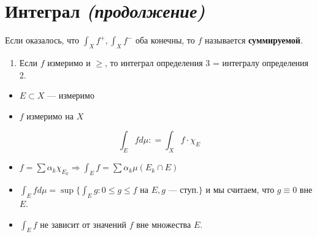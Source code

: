 

\cfoot{}



\section*{Интеграл \textit{(продолжение)}}

\begin{definition}
    Если оказалось, что \(\int_X f^{ +}, \int_X f^{ -}\) оба конечны, то \(f\) называется \textbf{суммируемой}.
\end{definition}

\begin{remark}\itemfix
    \begin{enumerate}
        \item Если \(f\) измеримо и \( \geq \), то интеграл определения 3 = интегралу определения 2.
    \end{enumerate}
\end{remark}

\begin{definition}[4]\itemfix
    \begin{itemize}
        \item \(E\subset X\) --- измеримо
        \item \(f\) измеримо на \(X\)
    \end{itemize}
    \[\int_E f d\mu : = \int_X f \cdot \chi_E\]
\end{definition}

\begin{remark}\itemfix
    \begin{itemize}
        \item \(f = \sum \alpha_k \chi_{E_k} \Rightarrow \int_E f = \sum \alpha_k \mu (E_k\cap E)\)
        \item \(\int_E f d\mu = \sup \{\int_E g : 0 \leq g \leq f \text{ на } E, g \text{ --- ступ.}\} \) и мы считаем, что \(g \equiv 0\) вне \(E\).
        \item \(\int_E f\) не зависит от значений \(f\) вне множества \(E\).
    \end{itemize}
\end{remark}

